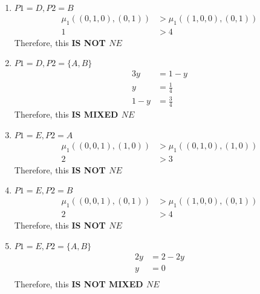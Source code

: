 \documentclass[12pt, a4paper]{article}
\begin{document}
\begin{enumerate}
\item $P1 = D, P2 = B$\\
 \begin{subequations}
  \begin{align}
    \mu_1((0,1,0),(0,1)) &> \mu_1((1,0,0),(0,1))\\
    1 &> 4
  \end{align}
\end{subequations}
Therefore, this \textbf{IS NOT $NE$}

\item $P1 = D, P2 = \{A,B\}$\\
 \begin{subequations}
  \begin{align}
    3y &= 1-y\\
     y &= \frac{1}{4}\\
    1-y &= \frac{3}{4}
  \end{align}
\end{subequations}
Therefore, this \textbf{IS MIXED $NE$}

\item $P1 = E, P2 = A$\\
 \begin{subequations}
  \begin{align}
    \mu_1((0,0,1),(1,0)) &> \mu_1((0,1,0),(1,0))\\
    2 &> 3
  \end{align}
\end{subequations}
Therefore, this \textbf{IS NOT $NE$}


\item $P1 = E, P2 = B$\\
 \begin{subequations}
  \begin{align}
    \mu_1((0,0,1),(0,1)) &> \mu_1((1,0,0),(0,1))\\
    2 &> 4
  \end{align}
\end{subequations}
Therefore, this \textbf{IS NOT $NE$}

\item $P1 = E, P2 = \{A,B\}$\\
 \begin{subequations}
  \begin{align}
    2y &= 2-2y\\
     y &= 0\\
  \end{align}
\end{subequations}
Therefore, this \textbf{IS NOT MIXED $NE$}


\end{enumerate}
\end{document}
